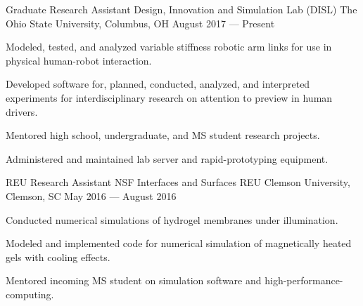 

\begin{cventries}

  \cventry
    {Graduate Research Assistant} %
    {Design, Innovation and Simulation Lab (DISL)} %
    {The Ohio State University, Columbus, OH} %
    {August 2017 --- Present} %
    {
      \begin{cvitems} %
        \item{Modeled, tested, and analyzed variable stiffness robotic arm links for use in physical human-robot interaction.}
        \item{Developed software for, planned, conducted, analyzed, and interpreted experiments for interdisciplinary research on attention to preview in human drivers.}
        \item{Mentored high school, undergraduate, and MS student research projects.}
        \item{Administered and maintained lab server and rapid-prototyping equipment.}
      \end{cvitems}
    }

  \cventry
    {REU Research Assistant} %
    {NSF Interfaces and Surfaces REU} %
    {Clemson University, Clemson, SC} %
    {May 2016 --- August 2016} %
    {
      \begin{cvitems} %
        \item {Conducted numerical simulations of hydrogel membranes under illumination.}
        \item {Modeled and implemented code for numerical simulation of magnetically heated gels with cooling effects.}
        \item {Mentored incoming MS student on simulation software and high-performance-computing.}
      \end{cvitems}
    }


\end{cventries}
